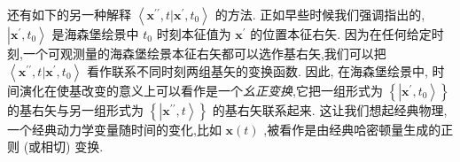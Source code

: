 还有如下的另一种解释 $\left\langle {{\mathbf{x}}^{\prime \prime }, t | {\mathbf{x}}^{\prime },{t}_{0}}\right\rangle$ 的方法. 正如早些时候我们强调指出的, $\left| {{\mathbf{x}}^{\prime },{t}_{0}}\right\rangle$ 是海森堡绘景中 ${t}_{0}$ 时刻本征值为 ${\mathbf{x}}^{\prime }$ 的位置本征右矢. 因为在任何给定时刻,一个可观测量的海森堡绘景本征右矢都可以选作基右矢,我们可以把 $\left\langle {{\mathbf{x}}^{\prime \prime }, t | {\mathbf{x}}^{\prime },{t}_{0}}\right\rangle$ 看作联系不同时刻两组基矢的变换函数. 因此, 在海森堡绘景中, 时间演化在使基改变的意义上可以看作是一个\textit{幺正变换},它把一组形式为 $\left\{ \left| {{\mathbf{x}}^{\prime },{t}_{0}}\right\rangle \right\}$ 的基右矢与另一组形式为 $\left\{ \left| {{\mathbf{x}}^{\prime \prime }, t}\right\rangle \right\}$ 的基右矢联系起来. 这让我们想起经典物理,一个经典动力学变量随时间的变化,比如 $\mathbf{x}\left( t\right)$ ,被看作是由经典哈密顿量生成的正则 (或相切) 变换.

